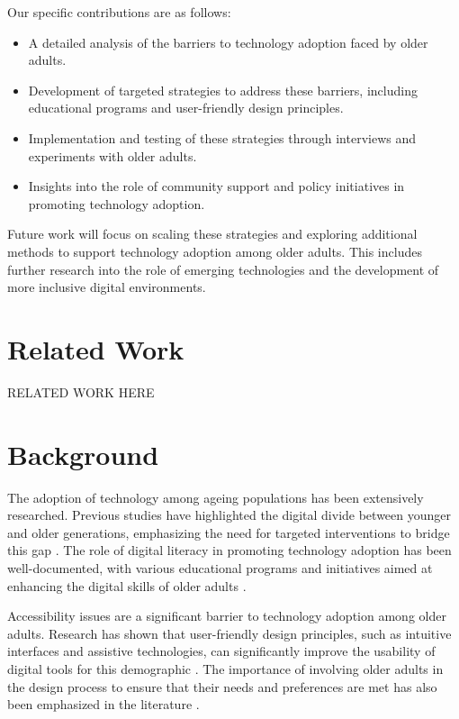 \documentclass{article} %
\begin{document}
Our specific contributions are as follows:
\begin{itemize}
    \item A detailed analysis of the barriers to technology adoption faced by older adults.
    \item Development of targeted strategies to address these barriers, including educational programs and user-friendly design principles.
    \item Implementation and testing of these strategies through interviews and experiments with older adults.
    \item Insights into the role of community support and policy initiatives in promoting technology adoption.
\end{itemize}

Future work will focus on scaling these strategies and exploring additional methods to support technology adoption among older adults. This includes further research into the role of emerging technologies and the development of more inclusive digital environments.

\section{Related Work}
\label{sec:related}
RELATED WORK HERE

\section{Background}
\label{sec:background}

The adoption of technology among ageing populations has been extensively researched. Previous studies have highlighted the digital divide between younger and older generations, emphasizing the need for targeted interventions to bridge this gap \citep{park2023generative, shanahan2023role}. The role of digital literacy in promoting technology adoption has been well-documented, with various educational programs and initiatives aimed at enhancing the digital skills of older adults \citep{wang2023describe}.

Accessibility issues are a significant barrier to technology adoption among older adults. Research has shown that user-friendly design principles, such as intuitive interfaces and assistive technologies, can significantly improve the usability of digital tools for this demographic \citep{liu2023agentbench}. The importance of involving older adults in the design process to ensure that their needs and preferences are met has also been emphasized in the literature \citep{poledna2023economic}.
\end{document}

